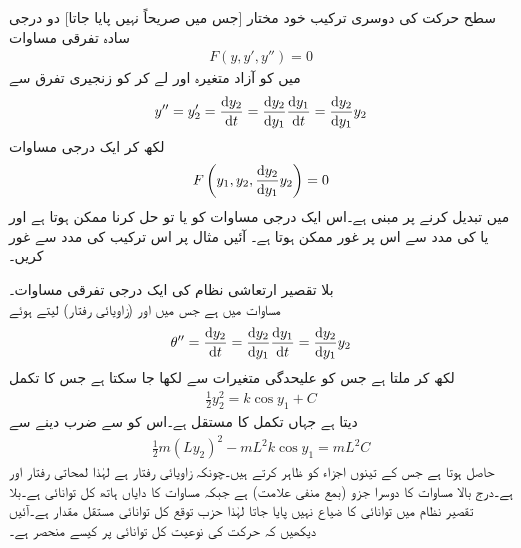 
سطح حرکت کی دوسری ترکیب خود مختار [جس میں  صریحاً نہیں پایا جاتا] دو درجی سادہ تفرقی مساوات
\begin{align*}
F(y,y',y'')=0
\end{align*}
میں  کو آزاد متغیرہ اور  لے کر  کو زنجیری تفرق سے
\begin{align*}
y''=y_2'=\frac{\dif y_2}{\dif t}=\frac{\dif y_2}{\dif y_1}\frac{\dif y_1}{\dif t}=\frac{\dif y_2}{\dif y_1}y_2
\end{align*}
لکھ کر ایک درجی مساوات
\begin{align}
F\left(y_1,y_2,\frac{\dif y_2}{\dif y_1}y_2\right)=0
\end{align}
میں تبدیل کرنے پر مبنی ہے۔اس ایک درجی مساوات کو یا تو حل کرنا ممکن ہوتا ہے اور یا  کی مدد سے اس پر غور ممکن ہوتا ہے۔ آئیں مثال  پر اس ترکیب کی مدد سے غور کریں۔

\quad بلا تقصیر ارتعاشی نظام کی ایک درجی تفرقی مساوات۔\\
مساوات  میں  ہے جس میں  اور   (زاویائی رفتار) لیتے ہوئے
\begin{align*}
\theta''=\frac{\dif y_2}{\dif t}=\frac{\dif y_2}{\dif y_1}\frac{\dif y_1}{\dif t}=\frac{\dif y_2}{\dif y_1}y_2
\end{align*}
لکھ کر  ملتا ہے جس کو علیحدگی متغیرات سے  لکھا جا سکتا ہے جس کا تکمل
\begin{align}\label{مساوات_نظام_کل_توانائی_الف}
\frac{1}{2}y_2^2=k\cos y_1+C 
\end{align}
دیتا ہے جہاں  تکمل کا مستقل ہے۔اس کو  سے ضرب دینے سے
\begin{align*}
\frac{1}{2}m(Ly_2)^2-mL^2k\cos y_1=mL^2C
\end{align*}
حاصل ہوتا ہے جس کے تینوں اجزاء  کو ظاہر کرتے ہیں۔چونکہ  زاویائی رفتار ہے لہٰذا  لمحاتی رفتار اور    ہے۔درج بالا مساوات کا دوسرا جزو (بمع منفی علامت)  ہے جبکہ مساوات کا دایاں ہاتھ  کل توانائی ہے۔بلا تقصیر نظام میں توانائی کا ضیاع نہیں پایا جاتا لہٰذا حزب توقع کل توانائی مستقل مقدار ہے۔آئیں دیکھیں کہ حرکت کی نوعیت کل توانائی پر کیسے منحصر ہے۔

